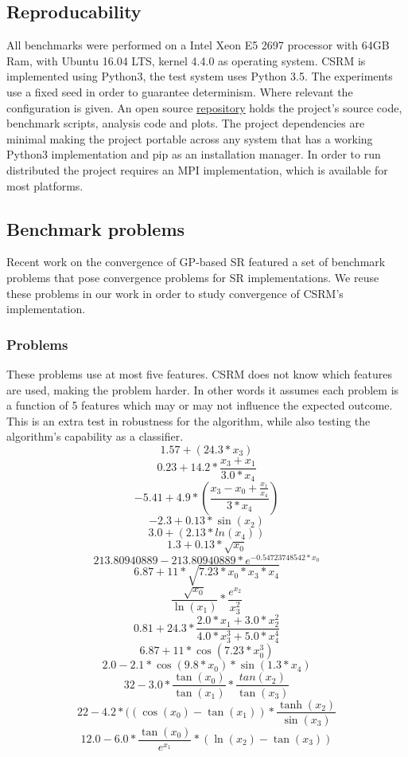 \subsection{Reproducability}
All benchmarks were performed on a Intel Xeon E5 2697 processor with 64GB Ram, with Ubuntu 16.04 LTS, kernel 4.4.0 as operating system.
CSRM is implemented using Python3, the test system uses Python 3.5. 
The experiments use a fixed seed in order to guarantee determinism. Where relevant the configuration is given. 
An open source \href{https://bitbucket.org/bcardoen/csrm}{repository} holds the project's source code, benchmark scripts, analysis code and plots. The project dependencies are minimal making the project portable across any system that has a working Python3 implementation and pip as an installation manager. In order to run distributed the project requires an MPI implementation, which is available for most platforms.
\subsection{Benchmark problems}
Recent work on the convergence of GP-based SR \cite{SRAccur, SRBaseline} featured a set of benchmark problems that pose convergence problems for SR implementations. We reuse these problems in our work in order to study convergence of CSRM's implementation.
\subsubsection{Problems}
These problems use at most five features. CSRM does not know which features are used, making the problem harder. In other words it assumes each problem is a function of 5 features which may or may not influence the expected outcome. This is an extra test in robustness for the algorithm, while also testing the algorithm's capability as a classifier. 
\[
1.57 + (24.3*x_3)\]
\[0.23+14.2*\frac{x_3+x_1}{3.0*x_4}
\]
\[
-5.41 + 4.9* ( \frac{x_3-x_0 +  \frac{x_1}{x_4} } {3*x_4} )
\] 
\[-2.3 + 0.13*\sin(x_2)\]
\[3.0 + (2.13 * ln(x_4))\]
\[1.3 + 0.13* \sqrt{x_0}\]
\[213.80940889 - 213.80940889*e^{-0.54723748542*x_0}\]
\[6.87+11*\sqrt{7.23*x_0*x_3*x_4}\]
\[\frac{\sqrt{x_0}}{\ln(x_1)} *\frac{e^{x_2}}{x_3 ^ 2}\]
\[ 0.81 + 24.3 * \frac{ 2.0*x_1+3.0*x_2^2} {4.0*x_3^3 + 5.0*x_4^4}\]
\[6.87+ 11* \cos(7.23*x_0^3)\]
\[2.0 - 2.1 * \cos(9.8*x_0) * \sin(1.3*x_4)\]
\[32-3.0*  \frac{\tan(x_0)}{\tan(x_1)} *  \frac{tan(x_2)} {\tan(x_3)} \]
\[22 - 4.2*((\cos(x_0)-\tan(x_1))*\frac{\tanh(x_2)}{\sin(x_3)}\]
\[12.0 - 6.0* \frac{\tan(x_0)}{e^{x_1}} * (\ln(x_2)-\tan(x_3) ) \]
                    

